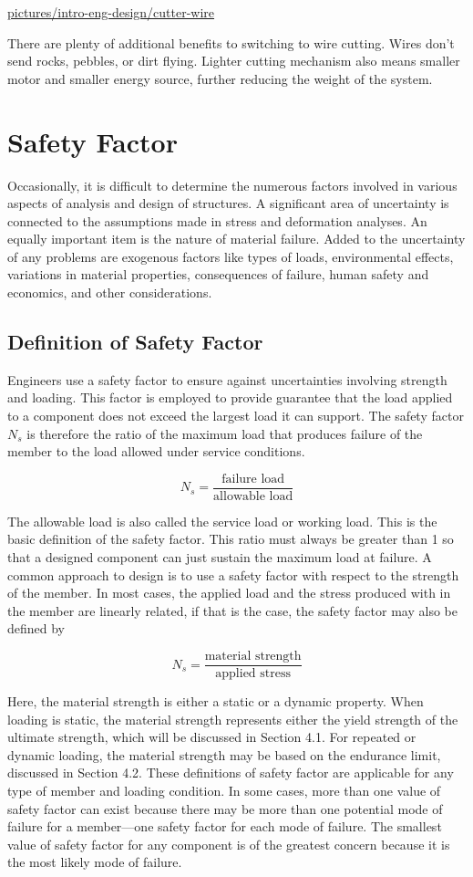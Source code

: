 \documentclass[a4paper,openany,12pt]{book}
\begin{document}
\url{pictures/intro-eng-design/cutter-wire}

There are plenty of additional benefits to switching to wire cutting.
Wires don't send rocks, pebbles, or dirt flying. Lighter cutting
mechanism also means smaller motor and smaller energy source, further
reducing the weight of the system.

\section{Safety Factor}
\label{sec:org38b901e}
Occasionally, it is difficult to determine the numerous factors involved
in various aspects of analysis and design of structures. A significant
area of uncertainty is connected to the assumptions made in stress and
deformation analyses. An equally important item is the nature of
material failure. Added to the uncertainty of any problems are exogenous
factors like types of loads, environmental effects, variations in
material properties, consequences of failure, human safety and
economics, and other considerations.

\subsection{Definition of Safety Factor}
\label{sec:org211aabf}
Engineers use a safety factor to ensure against uncertainties involving
strength and loading. This factor is employed to provide guarantee that
the load applied to a component does not exceed the largest load it can
support. The safety factor \(N_s\) is therefore the ratio of the maximum
load that produces failure of the member to the load allowed under
service conditions.

$$N_s = \frac{\text{failure load}}{\text{allowable load}}$$

The allowable load is also called the service load or working load. This
is the basic definition of the safety factor. This ratio must always be
greater than 1 so that a designed component can just sustain the maximum
load at failure. A common approach to design is to use a safety factor
with respect to the strength of the member. In most cases, the applied
load and the stress produced with in the member are linearly related, if
that is the case, the safety factor may also be defined by

$$N_s = \frac{\text{material strength}}{\text{applied stress}}$$

Here, the material strength is either a static or a dynamic property.
When loading is static, the material strength represents either the
yield strength of the ultimate strength, which will be discussed in
Section 4.1. For repeated or dynamic loading, the material strength may
be based on the endurance limit, discussed in Section 4.2. These
definitions of safety factor are applicable for any type of member and
loading condition. In some cases, more than one value of safety factor
can exist because there may be more than one potential mode of failure
for a member---one safety factor for each mode of failure. The smallest
value of safety factor for any component is of the greatest concern
because it is the most likely mode of failure.
\end{document}
